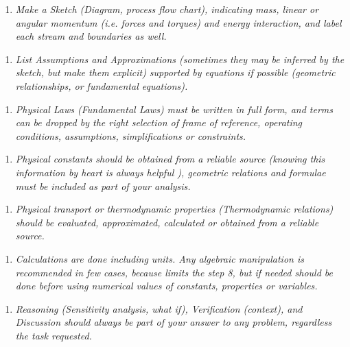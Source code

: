 \documentclass{article}
\begin{document}
\begin{enumerate}[resume]
\item \textit{Make a Sketch (Diagram, process flow chart), indicating mass, linear or angular momentum (i.e. forces and torques) and energy interaction, and label each stream and boundaries as well.}
\end{enumerate}



\begin{enumerate}[resume]
\item \textit{List Assumptions and Approximations (sometimes they may be inferred by the sketch, but make them explicit) supported by equations if possible (geometric relationships, or fundamental equations).}
\end{enumerate}



\begin{enumerate}[resume]
\item \textit{Physical Laws (Fundamental Laws) must be written in full form, and terms can be dropped by the right selection of frame of reference, operating conditions, assumptions, simplifications or constraints.}
\end{enumerate}



\begin{enumerate}[resume]
\item \textit{Physical constants should be obtained from a reliable source (knowing this information by heart is always helpful ), geometric relations and formulae must be included as part of your analysis.}
\end{enumerate}



\begin{enumerate}[resume]
\item \textit{Physical transport or thermodynamic properties (Thermodynamic relations) should be evaluated, approximated, calculated or obtained from a reliable source.}
\end{enumerate}



\begin{enumerate}[resume]
\item \textit{Calculations are done including units. Any algebraic manipulation is recommended in few cases, because limits the step 8, but if needed should be done before using numerical values of constants, properties or variables.}
\end{enumerate}



\begin{enumerate}[resume]
\item \textit{Reasoning (Sensitivity analysis, what if), Verification (context), and Discussion should always be part of your answer to any problem, regardless the task requested.}
\end{enumerate}



\printbibliography[title={References}]
\end{document}
